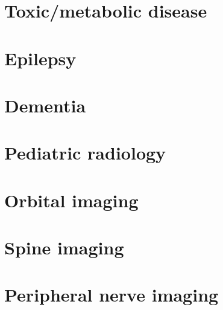 \documentclass[oneside,a4paper,11pt,explicit,twocolumn]{book}
\begin{document}
\part{Toxic/metabolic disease}




\part{Epilepsy}





\part{Dementia}



\part{Pediatric radiology}











\part{Orbital imaging}

\part{Spine imaging}

\part{Peripheral nerve imaging}

\end{document}
